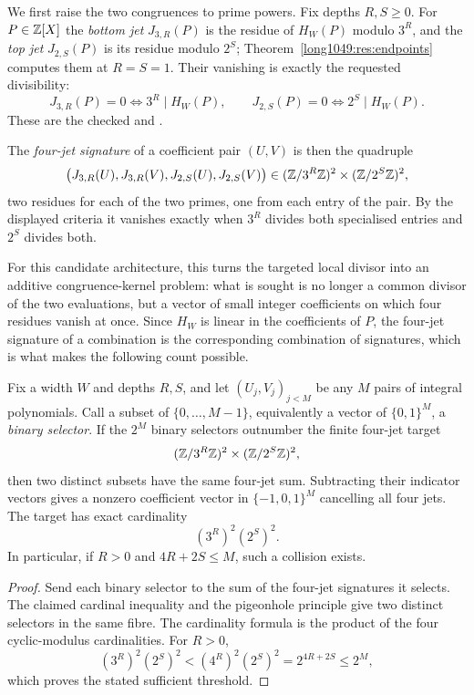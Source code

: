 \documentclass[11pt]{article}
\begin{document}
We first raise the two congruences to prime powers.  Fix depths \(R,S\ge0\).
For \(P\in\mathbb{Z}[X]\) the \emph{bottom jet} \(J_{3,R}(P)\) is the residue of
\(H_W(P)\) modulo \(3^R\), and the \emph{top jet} \(J_{2,S}(P)\) is its residue
modulo \(2^S\); Theorem~\ref{long1049:res:endpoints} computes them at \(R=S=1\).  Their
vanishing is exactly the requested divisibility:
\[
 J_{3,R}(P)=0\iff 3^R\mid H_W(P),\qquad
 J_{2,S}(P)=0\iff 2^S\mid H_W(P).
\]
These are the checked
 and
.

The \emph{four-jet signature} of a coefficient pair
\((U,V)\) is then the quadruple
\[
 \bigl(J_{3,R}(U),J_{3,R}(V),J_{2,S}(U),J_{2,S}(V)\bigr)
 \in(\mathbb{Z}/3^R\mathbb{Z})^2\times(\mathbb{Z}/2^S\mathbb{Z})^2 ,
\]
two residues for each of the two primes, one from each entry of the pair.  By
the displayed criteria it vanishes exactly when \(3^R\) divides both specialised
entries and \(2^S\) divides both.

For this candidate architecture, this turns the targeted local divisor into an additive
congruence-kernel problem: what is sought is no longer a common divisor of
the two evaluations, but a vector of small integer coefficients on which four
residues vanish at once.  Since \(H_W\) is linear in the coefficients of \(P\),
the four-jet signature of a combination is the corresponding combination of
signatures, which is what makes the following count possible.

\begin{theorem}\label{long1049:res:jetkernel}
Fix a width \(W\) and depths \(R,S\), and let \((U_j,V_j)_{j<M}\) be any \(M\)
pairs of integral polynomials.  Call a subset of \(\{0,\dots,M-1\}\), equivalently
a vector of \(\{0,1\}^M\), a \emph{binary selector}.  If the
\(2^M\) binary selectors outnumber the finite four-jet target
\[
 (\mathbb{Z}/3^R\mathbb{Z})^2\times(\mathbb{Z}/2^S\mathbb{Z})^2,
\]
then two distinct subsets have the same four-jet sum.  Subtracting their
indicator vectors gives a nonzero coefficient vector in
\(\{-1,0,1\}^M\) cancelling all four jets.  The target has exact cardinality
\[
 (3^R)^2(2^S)^2.
\]
In particular, if \(R>0\) and \(4R+2S\le M\), such a collision exists.
\end{theorem}

\begin{proof}
Send each binary selector to the sum of the four-jet signatures it selects.
The claimed cardinal inequality and the pigeonhole principle give two
distinct selectors in the same fibre.  The cardinality formula is the product
of the four cyclic-modulus cardinalities.  For \(R>0\),
\[
 (3^R)^2(2^S)^2<(4^R)^2(2^S)^2=2^{4R+2S}\le2^M,
\]
which proves the stated sufficient threshold.
\end{proof}
\end{document}
